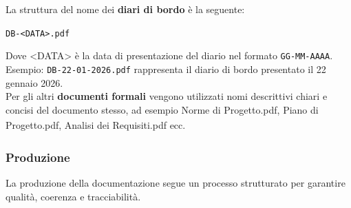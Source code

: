 \documentclass[a4paper,11pt]{article}
\newcommand{\G}{\textsubscript{\scalebox{0.6}{\textbf{G}}}}
\begin{document}
La struttura del nome dei \textbf{diari di bordo} è la seguente:
\begin{center}
\texttt{DB-<DATA>.pdf}
\end{center}
Dove <DATA> è la data di presentazione del diario nel formato \texttt{GG-MM-AAAA}. \\
Esempio: \texttt{DB-22-01-2026.pdf} rappresenta il diario di bordo presentato il 22 gennaio 2026. \\

Per gli altri \textbf{documenti formali} vengono utilizzati nomi descrittivi chiari e concisi del documento stesso,
ad esempio Norme di Progetto\G{}.pdf, Piano di Progetto\G{}.pdf, Analisi dei Requisiti\G{}.pdf ecc. 


\subsubsection{Produzione}
La produzione della documentazione segue un processo strutturato per garantire qualità\G{}, coerenza e tracciabilità\G{}.
\end{document}
